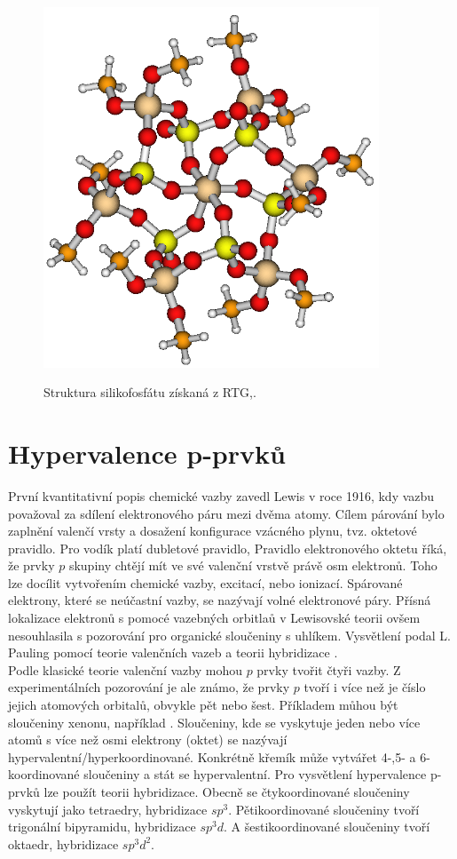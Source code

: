 \documentclass[
  digital, %
  table,   %
  lof,     %
  lot,     %
  oneside,
]{fithesis3}
\begin{document}
  \begin{figure}[h!]
  \caption{Struktura silikofosfátu získaná z RTG,\cite{C4TA06823H}. }
    \center
    \includegraphics[width=10cm]{struktura_puvodni.png}
    \label{rtg_koordinace_sest}
    \end{figure}

\section{Hypervalence p-prvků}
První kvantitativní popis chemické vazby zavedl Lewis v roce 1916, kdy vazbu považoval za sdílení elektronového páru mezi dvěma atomy. Cílem párování bylo zaplnění valenčí vrsty a dosažení konfigurace vzácného plynu, tvz. oktetové pravidlo. Pro vodík platí dubletové pravidlo, Pravidlo elektronového oktetu říká, že  prvky $p$ skupiny chtějí mít ve své valenční vrstvě právě osm elektronů. Toho lze docílit vytvořením chemické vazby, excitací, nebo ionizací. Spárované elektrony, které se neúčastní vazby, se nazývají volné elektronové páry. Přísná lokalizace elektronů s pomocé vazebných orbitlaů v Lewisovské teorii ovšem nesouhlasila s pozorování pro organické sloučeniny s uhlíkem. Vysvětlení podal L. Pauling pomocí teorie valenčních vazeb a teorii hybridizace \cite{Munzarova1996thesis}.\\

Podle klasické teorie valenční vazby mohou $p$ prvky tvořit čtyři vazby. Z experimentálních pozorování je ale známo, že prvky $p$  tvoří i více než je číslo jejich atomových orbitalů, obvykle pět nebo šest. Příkladem můhou být sloučeniny xenonu, například .
Sloučeniny, kde se vyskytuje jeden nebo více atomů s více než osmi elektrony (oktet) se nazývají hypervalentní/hyperkoordinované. Konkrétně křemík může vytvářet 4-,5- a 6- koordinované sloučeniny a stát se hypervalentní. Pro vysvětlení hypervalence p-prvků lze použít teorii hybridizace. Obecně se čtykoordinované sloučeniny vyskytují jako tetraedry, hybridizace $sp^3$. Pětikoordinované sloučeniny tvoří trigonální bipyramidu, hybridizace $sp^3d$. A šestikoordinované sloučeniny tvoří oktaedr, hybridizace $sp^3d^2$.\\
\end{document}
